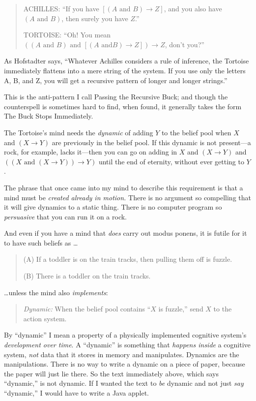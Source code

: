 \begin{quotation}
{
 ACHILLES: ``If you have $[(A\text{ and }B) \rightarrow 
Z]$, and you also have $(A\text{ and }B)$, then surely you have
$Z$.''}

{
 TORTOISE: ``Oh! You mean $((A\text{ and }B)\text{ and }[(A\text{ and
}B) \rightarrow  Z]) \rightarrow  Z$, don't
 you?''}
\end{quotation}

{
 As Hofstadter says, ``Whatever Achilles considers
a rule of inference, the Tortoise immediately flattens into a mere
string of the system. If you use only the letters A, B, and Z, you will
get a recursive pattern of longer and longer
strings.''}

{
 This is the anti-pattern I call Passing the Recursive Buck; and
though the counterspell is sometimes hard to find, when found, it
generally takes the form The Buck Stops Immediately.}

{
 The Tortoise's mind needs the \textit{dynamic} of
adding $Y$ to the belief pool when $X$ and $(X \rightarrow Y)$ are
previously in the belief pool. If this dynamic is not present---a rock,
for example, lacks it---then you can go on adding in $X$ and $(X
\rightarrow  Y)$ and $((X\text{ and }(X \rightarrow  Y)) \rightarrow  Y)$
until the end of eternity, without ever getting to $Y$.}

{
 The phrase that once came into my mind to describe this
requirement is that a mind must be \textit{created already in motion.}
There is no argument so compelling that it will give dynamics to a
static thing. There is no computer program so \textit{persuasive} that
you can run it on a rock.}

{
 And even if you have a mind that \textit{does} carry out modus
ponens, it is futile for it to have such beliefs as \ldots}

\begin{quotation}
{
 (A) If a toddler is on the train tracks, then pulling them off is
fuzzle.}

{
  (B) There is a toddler on the train tracks.}
\end{quotation}

{
 \ldots unless the mind also \textit{implements}:}

\begin{quotation}
{
 \textit{Dynamic:} When the belief pool contains
``$X$ is fuzzle,'' send $X$ to the
 action system.}
\end{quotation}

{
 By ``dynamic'' I mean a
property of a physically implemented cognitive system's
\textit{development over time}. A
``dynamic'' is something that
\textit{happens inside} a cognitive system, \textit{not} data that it
stores in memory and manipulates. Dynamics are the manipulations. There
is no way to write a dynamic on a piece of paper, because the paper
will just lie there. So the text immediately above, which says
``dynamic,'' is not dynamic. If I
wanted the text to \textit{be} dynamic and not just \textit{say}
``dynamic,'' I would have to write a
Java applet.}


